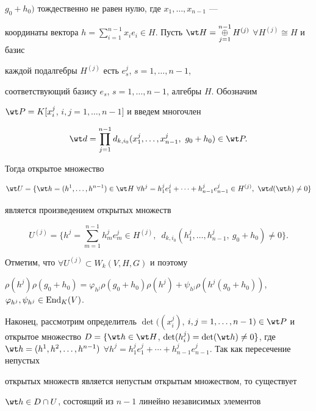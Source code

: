 $g_0+h_0)$ тождественно не равен нулю, где $x_1,\dotsc,x_{n-1}$ --- 


координаты вектора $h=\sum\limits^{n-1}_{i=1}x_ie_i\in H$. Пусть $\wt 


H=\mymat{\oplus}^{n-1}_{j=1}H^{(j)}$ $\forall H^{(j)}\cong H$ и базис 


каждой подалгебры $H^{(j)}$ есть $e^j_s$, $s=1,\dotsc,n-1$, 


соответствующий базису $e_s$, $s=1,\dotsc,n-1$, алгебры $H$. Обозначим 


$\wt P=K[x^j_i$, $i,j=1,\dotsc,n-1]$ и введем многочлен  


$$ 


\wt d=\prod^{n-1}_{j=1}d_{k,i_0} 


(x^j_1,\dotsc,x^j_{n-1},\ g_0+h_0)\in\wt P. 


$$ 


Тогда открытое множество 


$$ 


\wt U=\{\wt h=(h^1,\dotsc,h^{n-1})\in\wt H 


\ \forall h^j=h^j_1e^j_1+\dotsb+ 


h^j_{n-1}e^j_{n-1}\in H^{(j)}, \ \wt d(\wt h)\ne0\} 


$$ 


является произведением открытых множеств 


$$ 


U^{(j)}=\bigg\{h^j=\sum^{n-1}_{m=1}h^j_m e^j_m\in H^{(j)}, 


\ \; d_{k,i_0}(h^j_1,\dotsc,h^j_{n-1},\ g_0+h_0)\ne0\bigg\}. 


$$ 


Отметим, что $\forall U^{(j)}\subset W_k(V,H,G)$ и поэтому 


$\rho(h^j)\rho(g_0{+}h_0){=} \varphi_{h^j}\rho(g_0{+}h_0)\rho(h^j){+} 


\psi_{h^j}\rho(h^j(g_0+h_0))$, $\varphi_{h^j},\psi_{h^j}\in\End_K(V)$. 


Наконец, рассмотрим определитель $\det((x^j_i)$, $i,j=1,\dotsc,n-1)\in\wt 


P$ и открытое множество $D=\{\wt h\in\wt H$, $\det(h^j_i)=\det(\wt 


h)\ne0\}$, где $\wt h=(h^1,h^2,\dotsc,h^{n-1})$ $\forall 


h^j=h^j_1e^j_1+\dotsb+ h^j_{n-1}e^j_{n-1}$. Так как пересечение непустых 


открытых множеств является непустым открытым множеством, то существует 


$\wt h\in D\cap U$, состоящий из $n-1$ линейно независимых элементов 


